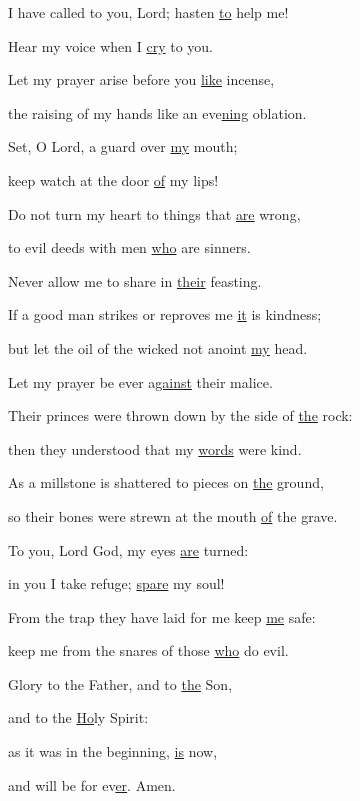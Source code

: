 \noindent I have called to you, Lord; hasten \uline{to} help me!~\GreStar{}~\nopagebreak

Hear my voice when I \uline{cry} to you.

\noindent Let my prayer arise before you \uline{like} incense,~\GreStar{}~\nopagebreak

the raising of my hands like an eve\uline{ning} oblation.

\noindent Set, O Lord, a guard over \uline{my} mouth;~\GreStar{}~\nopagebreak

keep watch at the door \uline{of} my lips!

\noindent Do not turn my heart to things that \uline{are} wrong,~\GreStar{}~\nopagebreak

to evil deeds with men \uline{who} are sinners.

\noindent Never allow me to share in \uline{their} feasting.~\GreStar{}~\nopagebreak

If a good man strikes or reproves me \uline{it} is kindness;

\noindent but let the oil of the wicked not anoint \uline{my} head.~\GreStar{}~\nopagebreak

Let my prayer be ever a\uline{gainst} their malice.

\noindent Their princes were thrown down by the side of \uline{the} rock:~\GreStar{}~\nopagebreak

then they understood that my \uline{words} were kind.

\noindent As a millstone is shattered to pieces on \uline{the} ground,~\GreStar{}~\nopagebreak

so their bones were strewn at the mouth \uline{of} the grave.

\noindent To you, Lord God, my eyes \uline{are} turned:~\GreStar{}~\nopagebreak

in you I take refuge; \uline{spare} my soul!

\noindent From the trap they have laid for me keep \uline{me} safe:~\GreStar{}~\nopagebreak

keep me from the snares of those \uline{who} do evil.

\noindent Glory to the Father, and to \uline{the} Son,~\GreStar{}~\nopagebreak

and to the \uline{Ho}ly Spirit:

\noindent as it was in the beginning, \uline{is} now,~\GreStar{}~\nopagebreak

and will be for ev\uline{er}. Amen.
